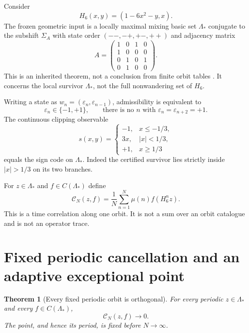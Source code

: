 \documentclass[11pt,a4paper]{article}
\newtheorem{theorem}{Theorem}[section]
\theoremstyle{remark}
\newcommand{\Mob}{\mu}
\newcommand{\Lam}{\Lambda_*}
\newcommand{\Hmap}{H_6}
\newcommand{\eps}{\varepsilon}
\newcommand{\cN}{\mathcal C_N}
\newcommand{\abs}[1]{\lvert#1\rvert}
\begin{document}
Consider
\begin{equation}
 \Hmap(x,y)=(1-6x^2-y,x).
 \label{eq:henon}
\end{equation}
The frozen geometric input is a locally maximal mixing basic set $\Lam$
conjugate to the subshift $\Sigma_A$ with state order
$(--,-+,+-,++)$ and adjacency matrix
\begin{equation}
 A=
 \begin{pmatrix}
 1&0&1&0\\
 1&0&0&0\\
 0&1&0&1\\
 0&1&0&0
 \end{pmatrix}.
 \label{eq:adjacency}
\end{equation}
This is an inherited theorem, not a conclusion from finite orbit tables
\cite{WangHenonWeighted2026}.  It concerns the local survivor $\Lam$, not the
full nonwandering set of $\Hmap$.

Writing a state as $w_n=(\eps_n,\eps_{n-1})$, admissibility is equivalent to
\begin{equation}
 \eps_n\in\{-1,+1\},\qquad
 \text{there is no }n\text{ with }\eps_n=\eps_{n+2}=+1.
 \label{eq:distance-two}
\end{equation}
The continuous clipping observable
\begin{equation}
 s(x,y)=
 \begin{cases}
 -1,&x\leq-1/3,\\
 3x,&\abs{x}<1/3,\\
 +1,&x\geq1/3
 \end{cases}
 \label{eq:sign-observable}
\end{equation}
equals the sign code on $\Lam$.  Indeed the certified survivor lies strictly
inside $\abs{x}>1/3$ on its two branches.

For $z\in\Lam$ and $f\in C(\Lam)$ define
\begin{equation}
 \cN(z,f)=\frac1N\sum_{n=1}^{N}\Mob(n)f(\Hmap^n z).
 \label{eq:correlation}
\end{equation}
This is a time correlation along one orbit.  It is not a sum over an orbit
catalogue and is not an operator trace.

\section{Fixed periodic cancellation and an adaptive exceptional point}

\begin{theorem}[Every fixed periodic orbit is orthogonal]
\label{thm:periodic}
For every periodic $z\in\Lam$ and every $f\in C(\Lam)$,
\begin{equation}
 \cN(z,f)\longrightarrow0.
 \label{eq:periodic-zero}
\end{equation}
The point, and hence its period, is fixed before $N\to\infty$.
\end{theorem}
\end{document}
